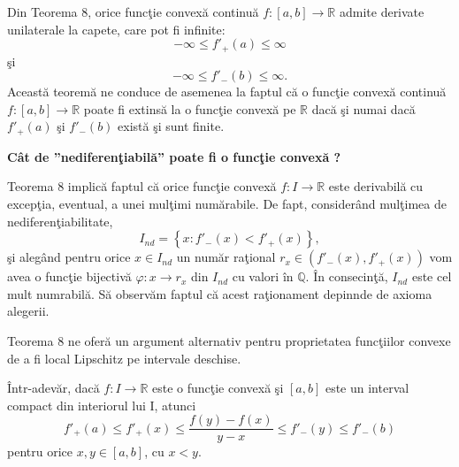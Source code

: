 \documentclass[a4paper,12pt,oneside]{report}
\begin{document}
Din Teorema 8, orice func\c{t}ie convex\u{a} continu\u{a} \(f:\left [ a,b \right ]\rightarrow \mathbb{R}\) admite derivate unilaterale la capete, care pot fi infinite:
\begin{displaymath}
   - \infty  \leq  {f}'_{+}\left ( a \right ) \leq \infty
\end{displaymath}
\c{s}i
\begin{displaymath}
- \infty  \leq  {f}'_{-}\left ( b \right ) \leq \infty.
\end{displaymath}
Aceast\u{a} teorem\u{a} ne conduce de asemenea la faptul c\u{a} o func\c{t}ie convex\u{a} continu\u{a} \(f:\left [ a,b \right ]\rightarrow \mathbb{R}\) poate fi extins\u{a} la o func\c{t}ie convex\u{a} pe \(\mathbb{R}\) dac\u{a} \c{s}i numai dac\u{a}   \({f}'_{+}\left ( a \right )\) \c{s}i  \( {f}'_{-}\left ( b \right )\)  exist\u{a} \c{s}i sunt finite.

\textbf{C\^{a}t de ”nediferen\c{t}iabil\u{a}” poate fi o func\c{t}ie convex\u{a} ?}

Teorema 8 implic\u{a} faptul c\u{a} orice func\c{t}ie convex\u{a} \(f:I \rightarrow \mathbb{R}\) este derivabil\u{a} cu excep\c{t}ia, eventual, a unei mul\c{t}imi num\u{a}rabile. De fapt, consider\^{a}nd mul\c{t}imea de nediferen\c{t}iabilitate,
\begin{displaymath}
   I_{nd} = \left \{ x : {f}'_{-}\left ( x \right )< {f}'_{+}\left ( x \right ) \right \},
\end{displaymath}
\c{s}i aleg\^{a}nd pentru orice \(x \in I_{nd}\) un num\u{a}r ra\c{t}ional \(r_{x} \in \left ( {f}'_{-}\left ( x \right ),  {f}'_{+}\left ( x \right )  \right )\) vom avea o func\c{t}ie bijectiv\u{a} \(\varphi : x \rightarrow r_{x}\) din \(I_{nd}\) cu valori \^{i}n \(\mathbb{Q}\). \^{I}n consecin\c{t}\u{a}, \(I_{nd}\) este cel mult numrabil\u{a}. S\u{a} observ\u{a}m faptul c\u{a} acest ra\c{t}ionament depinnde de axioma alegerii. 

Teorema 8 ne ofer\u{a} un argument alternativ pentru proprietatea func\c{t}iilor convexe de a fi local Lipschitz pe intervale deschise. 

\^{I}ntr-adev\u{a}r, dac\u{a} \(f : I \rightarrow \mathbb{R}\) este o func\c{t}ie convex\u{a} \c{s}i \(\left [ a,b \right ]\) este un interval compact din interiorul lui I, atunci
\begin{displaymath}
   {f}'_{+}\left ( a \right ) \leq {f}'_{+}\left ( x \right )\leq \frac{f\left ( y \right )- f\left ( x \right )}{y-x}\leq  {f}'_{-}\left ( y \right )\leq {f}'_{-}\left ( b \right )
\end{displaymath}
pentru orice \(x,y \in \left [ a,b \right ]\), cu \(x< y\). 
\end{document}
